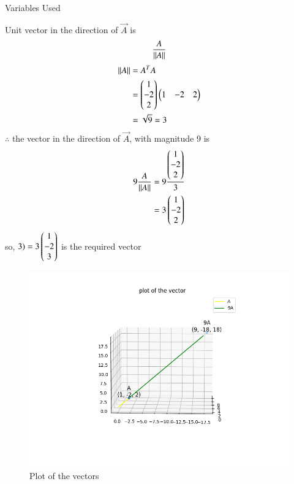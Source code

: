 \documentclass[journal]{IEEEtran}
\begin{document}
\begin{table}[h!]    
  \centering
  
  \caption{Variables Used}
  \label{tab1-1.9-6}
\end{table}
\solution
Unit vector in the direction of $\vec{A}$ is
\begin{align}
	\frac{A}{\left\lVert A\right\rVert}
\end{align}
\begin{align}
	\left\lVert A\right\rVert &= A^TA\\
	&= \begin{pmatrix}1\\-2\\2\end{pmatrix}\begin{pmatrix}1 & -2 & 2\end{pmatrix}\\
	&= \sqrt{9} = 3
\end{align}
$\therefore$ the vector in the direction of $\vec{A}$, with magnitude 9 is
\begin{align}
	9 \frac{A}{\left\lVert A\right\rVert} &= 9 \frac{\begin{pmatrix}1\\-2\\2\end{pmatrix}}{3}\\
	&= 3\begin{pmatrix}1\\-2\\2\end{pmatrix}
\end{align}
so, $3) = 3\begin{pmatrix}1\\-2\\3\end{pmatrix}$ is the required vector
\begin{figure}[h!]
   \centering
   \includegraphics[width = 1\linewidth]{figs/fig.png}
   \caption{Plot of the vectors}
   \label{stemplot}
\end{figure}
\end{document}
